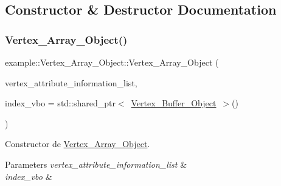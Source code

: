 \subsection{Constructor \& Destructor Documentation}
\mbox{\label{classexample_1_1_vertex___array___object_acc1cf052ffd4f1fe5e5302f0627d004e}} 
\subsubsection{\texorpdfstring{Vertex\_Array\_Object()}{Vertex\_Array\_Object()}\hspace{0.1cm}{\footnotesize\ttfamily [1/2]}}
{\footnotesize\ttfamily example\+::\+Vertex\+\_\+\+Array\+\_\+\+Object\+::\+Vertex\+\_\+\+Array\+\_\+\+Object (\begin{DoxyParamCaption}\item[{const std\+::initializer\+\_\+list$<$ \mbox{\hyperlink{structexample_1_1_vertex___array___object_1_1_vertex___attribute___information}{Vertex\+\_\+\+Attribute\+\_\+\+Information}} $>$ \&}]{vertex\+\_\+attribute\+\_\+information\+\_\+list,  }\item[{const std\+::shared\+\_\+ptr$<$ \mbox{\hyperlink{classexample_1_1_vertex___buffer___object}{Vertex\+\_\+\+Buffer\+\_\+\+Object}} $>$ \&}]{index\+\_\+vbo = {\ttfamily std\+:\+:shared\+\_\+ptr$<$~\mbox{\hyperlink{classexample_1_1_vertex___buffer___object}{Vertex\+\_\+\+Buffer\+\_\+\+Object}}~$>$()} }\end{DoxyParamCaption})}



Constructor de \mbox{\hyperlink{classexample_1_1_vertex___array___object}{Vertex\+\_\+\+Array\+\_\+\+Object}}. 


\begin{DoxyParams}{Parameters}
{\em vertex\+\_\+attribute\+\_\+information\+\_\+list} & \\
\hline
{\em index\+\_\+vbo} & \\
\hline
\end{DoxyParams}
\mbox{\label{classexample_1_1_vertex___array___object_a142c57794b128e840c341750dd79d8a9}} 
